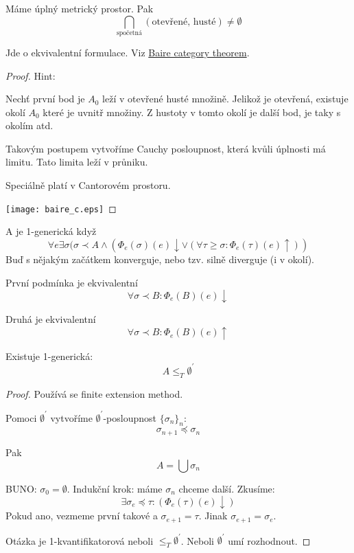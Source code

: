 \begin{theorem}
	Máme úplný metrický prostor. Pak
	\[ \bigcap_{\text{spočetná}} (\text{otevřené, husté}) \ne \emptyset \]

	Jde o ekvivalentní formulace. Viz \href{https://en.wikipedia.org/wiki/Baire_category_theorem}{Baire category theorem}.
\end{theorem}
\begin{proof}
	Hint:

	Nechť první bod je $A_0$ leží v otevřené husté množině.
	Jelikož je otevřená, existuje okolí $A_0$ které je uvnitř množiny.
	Z hustoty v tomto okolí je další bod, je taky s okolím atd.

	Takovým postupem vytvoříme Cauchy posloupnost, která kvůli úplnosti má limitu.
	Tato limita leží v průniku.

	Speciálně platí v Cantorovém prostoru.

	\texttt{[image: baire\_c.eps]}
\end{proof}

\begin{definition}[1-generická]
	A je 1-generická když
	\[ \forall e \exists \sigma(\sigma \prec A \land (\Phi_e(\sigma)(e)\downarrow \lor (\forall \tau \geq \sigma: \Phi_e(\tau)(e)\uparrow)) \]
	Buď s nějakým začátkem konverguje, nebo tzv. silně diverguje (i v okolí).

	První podmínka je ekvivalentní
	\[ \forall \sigma \prec B: \Phi_e(B)(e) \downarrow \]

	Druhá je ekvivalentní
	\[ \forall \sigma \prec B: \Phi_e(B)(e) \uparrow \]
\end{definition}

\begin{theorem}
	Existuje 1-generická:
	\[ A \leq_T \emptyset^{\prime} \]
\end{theorem}
\begin{proof}
	Používá se finite extension method.

	Pomoci $\emptyset^{\prime}$ vytvoříme $\emptyset^{\prime}$-posloupnost $\{\sigma_n\}_n$:
	\[ \sigma_{n + 1} \preccurlyeq \sigma_n \]

	Pak
	\[ A = \bigcup \sigma_n \]

	BUNO: $\sigma_0 = \emptyset$.
	Indukční krok: máme $\sigma_n$ chceme další.
	Zkusíme:
	\[ \exists \sigma_e \preccurlyeq \tau: (\Phi_e(\tau)(e)\downarrow) \]
	Pokud ano, vezmeme první takové a $\sigma_{e + 1} = \tau$.
	Jinak $\sigma_{e + 1} = \sigma_e$.

	Otázka je 1-kvantifikatorová neboli $\leq_T \emptyset^{\prime}$. Neboli $\emptyset^{\prime}$ umí rozhodnout.
\end{proof}

